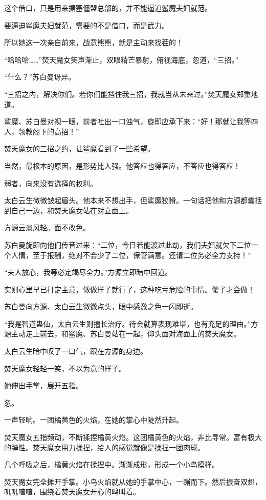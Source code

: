 \begin{this_body}
这个借口，只是用来搪塞僵盟总部的，并不能逼迫鲨魔夫妇就范。

要逼迫鲨魔夫妇就范，需要的不是借口，而是武力。

所以她这一次亲自前来，战意熊熊，就是主动来找茬的！

“哈哈哈……”焚天魔女笑声渐止，双眼精芒暴射，俯视海底，忽道，“三招。”

“什么？”苏白曼讶异。

“三招之内，解决你们。若你们能挡住我三招，我就当从未来过。”焚天魔女郑重地道。

鲨魔、苏白曼对视一眼，前者吐出一口浊气，旋即应承下来：“好！那就让我等四人，领教阁下的高招！”

焚天魔女的三招之约，让鲨魔看到了一些希望。

当然，最根本的原因，是形势比人强。他答应也得答应，不答应也得答应！

弱者，向来没有选择的权利。

太白云生微微皱起眉头。他本来不想出手，但鲨魔狡猾。一句话把他和方源都囊括到自己一边，和焚天魔女站在对立面上。

方源云淡风轻。面不改色。

苏白曼旋即向他们传音过来：“二位，今日若能渡过此劫，我们夫妇就欠下二位一个人情，至于报酬，绝对不会少了二位，保管满意。还请二位务必全力支持！”

“夫人放心，我等必定竭尽全力。”方源立即暗中回道。

实则心里早已打定主意，做做样子就行了，这种吃亏危险的事情。傻子才会做！

苏白曼向方源、太白云生微微点头，眼中感激之色一闪即逝。

“我是智道蛊仙，太白云生则擅长治疗。待会就算表现难堪，也有充足的理由。”方源主动走上前去，和鲨魔、苏白曼站在一起，仰头面对海面上的焚天魔女。

太白云生暗中叹了一口气，跟在方源的身边。

焚天魔女轻轻一笑，不以为意的样子。

她伸出手掌，展开五指。

忽。

一声轻响。一团橘黄色的火焰，在她的掌心中陡然升起。

焚天魔女五指频动，不断揉捏橘黄火焰。这团橘黄色的火焰，非比寻常。富有极大的弹性。焚天魔女用力揉捏，给人的感觉就像是揉捏一团肉球。

几个呼吸之后，橘黄火焰在揉捏中。渐渐成形，形成一个小鸟模样。

焚天魔女完全摊开手掌。小鸟火焰就从她的手掌中心，一蹦而下。然后振奋双翅，叽叽喳喳，围绕着焚天魔女开心的鸣叫着。


\end{this_body}
